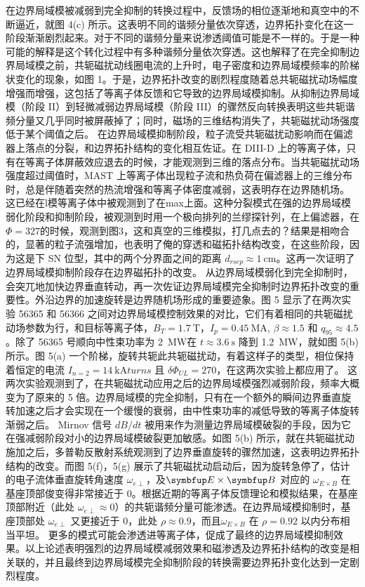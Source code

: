 在边界局域模被减弱到完全抑制的转换过程中，反馈场的相位逐渐地和真空中的不断逼近，就图 4(c) 所示。这表明不同的谐频分量依次穿透，边界拓扑变化在这一阶段渐渐剧烈起来。对于不同的谐频分量来说渗透阈值可能是不一样的。于是一种可能的解释是这个转化过程中有多种谐频分量依次穿透。这也解释了在完全抑制边界局域模之前，共轭磁扰动线圈电流的上升时，电子密度和边界局域模频率的阶梯状变化的现象，如图 1。于是，边界拓扑改变的剧烈程度随着总共轭磁扰动场幅度增强而增强，这包括了等离子体反馈和它导致的边界局域模抑制。从抑制边界局域模（阶段 II）到轻微减弱边界局域模（阶段 III）的骤然反向转换表明这些共轭谐频分量又几乎同时被屏蔽掉了；同时，磁场的三维结构消失了，共轭磁扰动场强度低于某个阈值之后。
在边界局域模抑制阶段，粒子流受共轭磁扰动影响而在偏滤器上落点的分裂，和边界拓扑结构的变化相互佐证。在 DIII-D 上的\Lmode 等离子体，只有在等离子体屏蔽效应退去的时候，才能观测到三维的落点分布。当共轭磁扰动场强度超过阈值时，MAST 上\Lmode 等离子体出现粒子流和热负荷在偏滤器上的三维分布时，总是伴随着突然的热流增强和等离子体密度减弱，这表明存在边界随机场。
这已经在l模等离子体中被观测到了在max上面。这种分裂模式在强的边界局域模弱化阶段和抑制阶段，被观测到时用一个极向排列的兰缪探针列，在上偏滤器，在 $\Phi =327$\degree 的时候，观测到图3，这和真空的三维模拟，打几点去的？结果是相吻合的，显著的粒子流强增加，也表明了俺的穿透和磁拓扑结构改变，在这些阶段，因为这是下 SN 位型，其中的两个分界面之间的距离 $d_{rsep}\approx \SI{1}{\centi\metre}$。这再一次证明了边界局域模抑制阶段存在边界磁拓扑的改变。
从边界局域模弱化到完全抑制时，会突兀地加快边界垂直转动，再一次佐证边界局域模完全抑制时边界拓扑改变的重要性。外沿边界的加速旋转是边界随机场形成的重要迹象。图 5 显示了在两次实验 56365 和 56366 之间对边界局域模控制效果的对比，它们有着相同的共轭磁扰动场参数为行，和目标等离子体，$B_T=\SI{1.7}{\tesla}$，$I_p=\SI{0.45}{\mega\ampere}$, $\beta\approx 1.5$ 和 $q_{95}\approx 4.5$。除了 56365 号顺向中性束功率为 \SI{2}{\mega\watt}在 $t\approx \SI{3.6}{\second}$ 降到 \SI{1.2}{\mega\watt}，就如图 5(b) 所示。图 5(a) 一个阶梯，旋转共轭此共轭磁扰动，有着这样子的类型，相位保持着恒定的电流 $I_{n=2}=\SI{14}{\kilo\ampere turns}$ 且 $\delta\Phi_{UL}=270$\degree，在这两次实验上都应用了。
这两次实验观测到了，在共轭磁扰动应用之后的边界局域模强烈减弱阶段，频率大概变为了原来的 5 倍。边界局域模的完全抑制，只有在一个额外的瞬间边界垂直旋转加速之后才会实现在一个缓慢的衰弱，由中性束功率的减低导致的等离子体旋转渐弱之后。 Mirnov 信号 $dB/dt$ 被用来作为测量边界局域模破裂的手段，因为它在强减弱阶段对小的边界局域模破裂更加敏感。如图 5(b) 所示，就在共轭磁扰动施加之后，多普勒反散射系统观测到了边界垂直旋转的骤然加速，这表明边界拓扑结构的改变。而图 5(f)，5(g) 展示了共轭磁扰动启动后，因为旋转急停了，估计的电子流体垂直旋转角速度 $\omega_{e\perp}$，及$\Vect{E}\times\Vect{B}$ 对应的 $\omega_{E\times B}$ 在基座顶部俊变得非常接近于 0。根据近期的等离子体反馈理论和模拟结果，在基座顶部附近（此处 $\omega_{e\perp}\approx 0$）的共轭谐频分量可能渗透。在边界局域模抑制时，基座顶部处 $\omega_{e\perp}$ 又更接近于 0，此处 $\rho \approx 0.9$，而且$\omega_{E\times B}$ 在 $\rho=0.92$ 以内分布相当平坦。
更多的模式可能会渗透进等离子体，促成了最终的边界局域模抑制效果。以上论述表明强烈的边界局域模减弱效果和磁渗透及边界拓扑结构的改变是相关联的，并且最终到边界局域模完全抑制阶段的转换需要边界拓扑变化达到一定剧烈程度。

